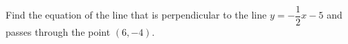 Find the equation of the line that is perpendicular to the line $y=-\dfrac{1}{2}x-5$ and passes through the point $(6,-4)$.
